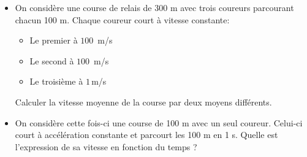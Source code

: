 \bexo
\begin{itemize}
	\item On considère une course de relais de 300 m avec trois coureurs parcourant chacun 100 m. Chaque coureur court à vitesse constante:
	\begin{itemize}
		\item Le premier à $100\,$ m/s
		\item Le second à $100\,$ m/s
		\item Le troisième à $1\, $m/s
\end{itemize}
	Calculer la vitesse moyenne de la course par deux moyens différents.		 
	\item On considère cette fois-ci une course de 100 m avec un seul coureur. Celui-ci court à accélération constante et parcourt les 100 m en 1 s. Quelle est l'expression de sa vitesse en fonction du temps ?  
\end{itemize}

\eexo


